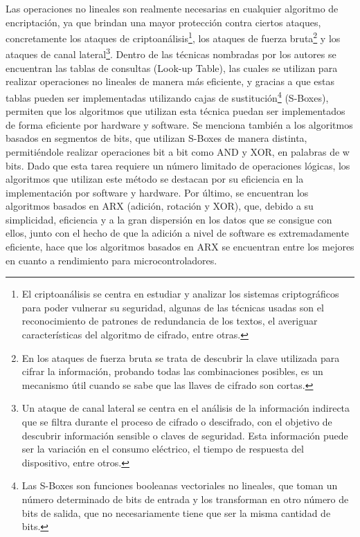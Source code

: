 \documentclass[a4paper,10pt]{article}
\begin{document}
	Las operaciones no lineales son realmente necesarias en cualquier algoritmo de encriptación, ya que brindan una mayor protección contra ciertos ataques, concretamente los ataques de criptoanálisis\footnote{El criptoanálisis se centra en estudiar y analizar los sistemas criptográficos para poder vulnerar su seguridad, algunas de las técnicas usadas son el reconocimiento de patrones de redundancia de los textos, el averiguar características del algoritmo de cifrado, entre otras.}, los ataques de fuerza bruta\footnote{En los ataques de fuerza bruta se trata de descubrir la clave utilizada para cifrar la información, probando todas las combinaciones posibles, es un mecanismo útil cuando se sabe que las llaves de cifrado son cortas.} y los ataques de canal lateral\footnote{Un ataque de canal lateral se centra en el análisis de la información indirecta que se filtra durante el proceso de cifrado o descifrado, con el objetivo de descubrir información sensible o claves de seguridad. Esta información puede ser la variación en el consumo eléctrico, el tiempo de respuesta del dispositivo, entre otros.}. Dentro de las técnicas nombradas por los autores se encuentran las tablas de consultas (Look-up Table), las cuales se utilizan para realizar operaciones no lineales de manera más eficiente, y gracias a que estas tablas pueden ser implementadas utilizando cajas de sustitución\footnote{Las S-Boxes son funciones booleanas vectoriales no lineales, que toman un número determinado de bits de entrada y los transforman en otro número de bits de salida, que no necesariamente tiene que ser la misma cantidad de bits.} (S-Boxes), permiten que los algoritmos que utilizan esta técnica puedan ser implementados de forma eficiente por hardware y software. Se menciona también a los algoritmos basados en segmentos de bits, que utilizan S-Boxes de manera distinta, permitiéndole realizar operaciones bit a bit como AND y XOR, en palabras de w bits. Dado que esta tarea requiere un número limitado de operaciones lógicas, los algoritmos que utilizan este método se destacan por su eficiencia en la implementación por software y hardware. Por último, se encuentran los algoritmos basados en ARX (adición, rotación y XOR), que, debido a su simplicidad, eficiencia y a la gran dispersión en los datos que se consigue con ellos, junto con el hecho de que la adición a nivel de software es extremadamente eficiente, hace que los algoritmos basados en ARX se encuentran entre los mejores en cuanto a rendimiento para microcontroladores.
	
\end{document}
